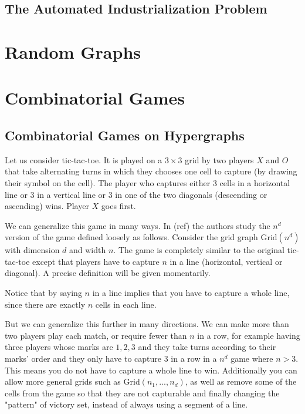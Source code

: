 \documentclass[]{article}
\theoremstyle{definition}
\theoremstyle{definition}
\begin{document}
\subsection{The Automated Industrialization Problem}





\section{Random Graphs}

\section{Combinatorial Games}
\subsection{Combinatorial Games on Hypergraphs}

Let us consider tic-tac-toe. It is played on a $3\times3$ grid by two players $X$ and $O$ that take alternating turns in which they chooses one cell to capture (by drawing their symbol on the cell). The player who captures either 3 cells in a horizontal line or 3 in a vertical line or 3 in one of the two diagonals (descending or ascending) wins. Player $X$ goes first.

We can generalize this game in many ways. In (ref) the authors study the $n^d$ version of the game defined loosely as follows. Consider the grid graph $\text{Grid}(n^d)$ with dimension $d$ and width $n$. The game is completely similar to the original tic-tac-toe except that players have to capture $n$ in a line (horizontal, vertical or diagonal). A precise definition will be given momentarily.

Notice that by saying $n$ in a line implies that you have to capture a whole line, since there are exactly $n$ cells in each line.

But we can generalize this further in many directions. We can make more than two players play each match, or require fewer than $n$ in a row, for example having three players whose marks are $1, 2, 3$ and they take turns according to their marks' order and they only have to capture 3 in a row in a $n^d$ game where $n > 3$. This means you do not have to capture a whole line to win. Additionally you can allow more general grids such as $\text{Grid}(n_1, ..., n_d)$, as well as remove some of the cells from the game so that they are not capturable and finally changing the "pattern" of victory set, instead of always using a segment of a line. 
\end{document}
